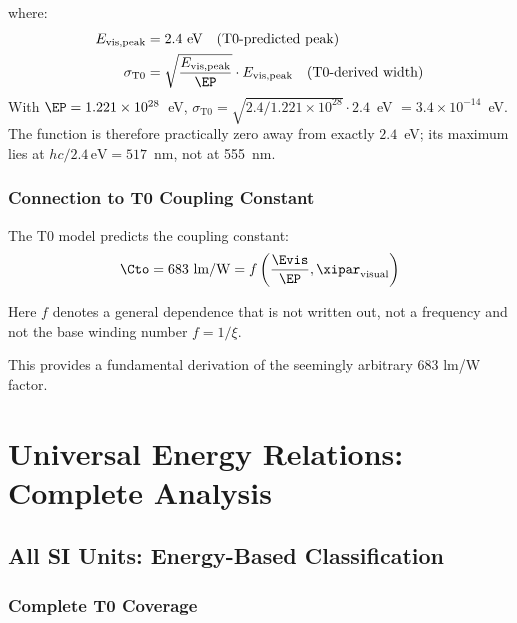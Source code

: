 	where:
	\begin{align}
		E_{\text{vis,peak}} &= 2.4 \text{ eV} \quad \text{(T0-predicted peak)} \\
		\sigma_{\text{T0}} &= \sqrt{\frac{E_{\text{vis,peak}}}{\EP}} \cdot E_{\text{vis,peak}} \quad \text{(T0-derived width)}
	\end{align}
	With $\EP = 1.221\times10^{28}$~eV, $\sigma_{\text{T0}} = \sqrt{2.4/1.221\times10^{28}} \cdot 2.4$~eV $= 3.4\times10^{-14}$~eV. The function is therefore practically zero away from exactly $2.4$~eV; its maximum lies at $hc/2.4\,\text{eV} = 517$~nm, not at 555~nm.
	
	\subsubsection{Connection to T0 Coupling Constant}
	\label{subsubsec:t0_coupling_constant}
	
	The T0 model predicts the coupling constant:
	\begin{equation}
		\Cto = 683 \text{ lm/W} = f\left(\frac{\Evis}{\EP}, \xipar_{\text{visual}}\right)
		\label{eq:t0_coupling_prediction}
	\end{equation}

	Here $f$ denotes a general dependence that is not written out, not a frequency and not the base winding number $f = 1/\xi$.

	This provides a fundamental derivation of the seemingly arbitrary 683 lm/W factor.
	
	\section{Universal Energy Relations: Complete Analysis}
	\label{sec:universal_energy_relations}
	
	\subsection{All SI Units: Energy-Based Classification}
	\label{subsec:all_si_energy_based}
	
	\subsubsection{Complete T0 Coverage}
	\label{subsubsec:complete_t0_coverage}
	
